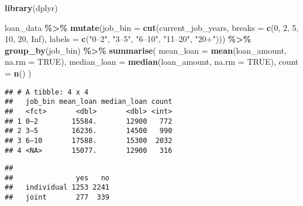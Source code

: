 \documentclass[
]{article}
\newenvironment{Shaded}{\begin{snugshade}}{\end{snugshade}}
\newcommand{\AttributeTok}[1]{\textcolor[rgb]{0.13,0.29,0.53}{#1}}
\newcommand{\CommentTok}[1]{\textcolor[rgb]{0.56,0.35,0.01}{\textit{#1}}}
\newcommand{\ConstantTok}[1]{\textcolor[rgb]{0.56,0.35,0.01}{#1}}
\newcommand{\DecValTok}[1]{\textcolor[rgb]{0.00,0.00,0.81}{#1}}
\newcommand{\FunctionTok}[1]{\textcolor[rgb]{0.13,0.29,0.53}{\textbf{#1}}}
\newcommand{\NormalTok}[1]{#1}
\newcommand{\OtherTok}[1]{\textcolor[rgb]{0.56,0.35,0.01}{#1}}
\newcommand{\SpecialCharTok}[1]{\textcolor[rgb]{0.81,0.36,0.00}{\textbf{#1}}}
\newcommand{\StringTok}[1]{\textcolor[rgb]{0.31,0.60,0.02}{#1}}
\begin{document}
\begin{Shaded}
\begin{Highlighting}[]
\FunctionTok{library}\NormalTok{(dplyr)}

\NormalTok{loan\_data }\SpecialCharTok{\%\textgreater{}\%}
  \FunctionTok{mutate}\NormalTok{(}\AttributeTok{job\_bin =} \FunctionTok{cut}\NormalTok{(current\_job\_years, }\AttributeTok{breaks =} \FunctionTok{c}\NormalTok{(}\DecValTok{0}\NormalTok{, }\DecValTok{2}\NormalTok{, }\DecValTok{5}\NormalTok{, }\DecValTok{10}\NormalTok{, }\DecValTok{20}\NormalTok{, }\ConstantTok{Inf}\NormalTok{),}
                       \AttributeTok{labels =} \FunctionTok{c}\NormalTok{(}\StringTok{"0–2"}\NormalTok{, }\StringTok{"3–5"}\NormalTok{, }\StringTok{"6–10"}\NormalTok{, }\StringTok{"11–20"}\NormalTok{, }\StringTok{"20+"}\NormalTok{))) }\SpecialCharTok{\%\textgreater{}\%}
  \FunctionTok{group\_by}\NormalTok{(job\_bin) }\SpecialCharTok{\%\textgreater{}\%}
  \FunctionTok{summarise}\NormalTok{(}
    \AttributeTok{mean\_loan =} \FunctionTok{mean}\NormalTok{(loan\_amount, }\AttributeTok{na.rm =} \ConstantTok{TRUE}\NormalTok{),}
    \AttributeTok{median\_loan =} \FunctionTok{median}\NormalTok{(loan\_amount, }\AttributeTok{na.rm =} \ConstantTok{TRUE}\NormalTok{),}
    \AttributeTok{count =} \FunctionTok{n}\NormalTok{()}
\NormalTok{  )}
\end{Highlighting}
\end{Shaded}

\begin{verbatim}
## # A tibble: 4 x 4
##   job_bin mean_loan median_loan count
##   <fct>       <dbl>       <dbl> <int>
## 1 0–2        15584.       12900   772
## 2 3–5        16236.       14500   990
## 3 6–10       17588.       15300  2032
## 4 <NA>       15077.       12900   316
\end{verbatim}

\begin{Shaded}
\end{Shaded}

\begin{verbatim}
##             
##               yes   no
##   individual 1253 2241
##   joint       277  339
\end{verbatim}
\end{document}
